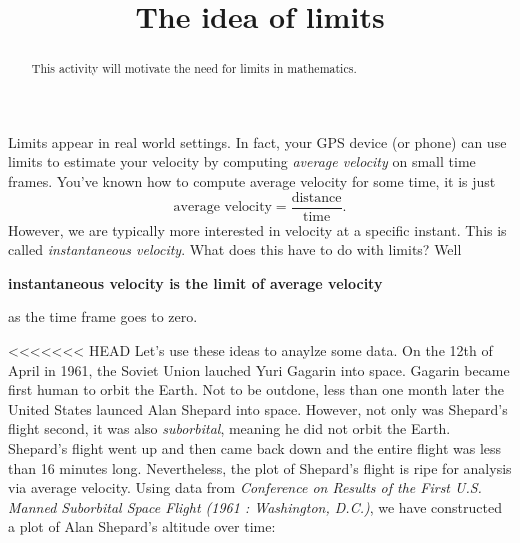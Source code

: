 \documentclass{ximera}
\title{The idea of limits}
\begin{document}
\begin{abstract}
  This activity will motivate the need for limits in mathematics.
\end{abstract}
\maketitle

Limits appear in real world settings. In fact, your GPS device (or
phone) can use limits to estimate your velocity by computing
\textit{average velocity} on small time frames. You've known how to
compute average velocity for some time, it is just
\[
\text{average velocity} = \frac{\text{distance}}{\text{time}}.
\]
However, we are typically more interested in velocity at a specific
instant. This is called \textit{instantaneous velocity}. What does
this have to do with limits? Well 
\begin{center}
  \textbf{instantaneous velocity is the limit of average velocity} 
\end{center}
as the time frame goes to zero.

<<<<<<< HEAD
Let's use these ideas to anaylze some data. On the 12th of April in
1961, the Soviet Union lauched Yuri Gagarin into space. Gagarin became
first human to orbit the Earth. Not to be outdone, less than one month
later the United States launced Alan Shepard into space. However, not
only was Shepard's flight second, it was also \textit{suborbital},
meaning he did not orbit the Earth. Shepard's flight went up and then
came back down and the entire flight was less than 16 minutes
long. Nevertheless, the plot of Shepard's flight is ripe for analysis
via average velocity. Using data from \textit{Conference on Results of
  the First U.S. Manned Suborbital Space Flight (1961 : Washington,
  D.C.)}, we have constructed a plot of Alan Shepard's altitude over
time:
\end{document}
